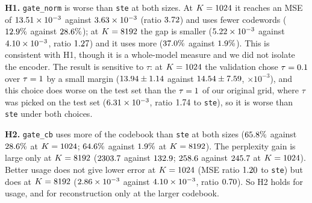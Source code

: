 \documentclass[11pt]{article}
\newcommand{\est}[1]{\texttt{#1}}
\begin{document}
\textbf{H1.} \est{gate\_norm} is worse than \est{ste} at both sizes. At $K=1024$ it reaches an MSE of
$13.51\times10^{-3}$ against $3.63\times10^{-3}$ (ratio
$3.72$) and uses fewer codewords ($12.9\%$ against
$28.6\%$); at $K=8192$ the gap is smaller ($5.22\times10^{-3}$ against
$4.10\times10^{-3}$, ratio $1.27$) and it uses more
($37.0\%$ against $1.9\%$). This is consistent with H1, though it is a
whole-model measure and we did not isolate the encoder. The result is sensitive to $\tau$: at
$K=1024$ the validation chose $\tau=0.1$ over $\tau=1$ by a small margin
($13.94\pm1.14$ against
$14.54\pm7.59$, $\times10^{-3}$), and this choice does worse
on the test set than the $\tau=1$ of our original grid, where $\tau$ was picked on the test
set ($6.31\times10^{-3}$, ratio $1.74$ to \est{ste}),
so it is worse than \est{ste} under both choices.

\textbf{H2.} \est{gate\_cb} uses more of the codebook than \est{ste} at both sizes
($65.8\%$ against $28.6\%$ at $K=1024$; $64.6\%$ against
$1.9\%$ at $K=8192$). The perplexity gain is large only at $K=8192$
($2303.7$ against $132.9$; $258.6$ against $245.7$ at
$K=1024$). Better usage does not give lower error at $K=1024$ (MSE ratio
$1.20$ to \est{ste}) but does at $K=8192$ ($2.86\times10^{-3}$
against $4.10\times10^{-3}$, ratio $0.70$). So H2 holds for usage,
and for reconstruction only at the larger codebook.
\end{document}
